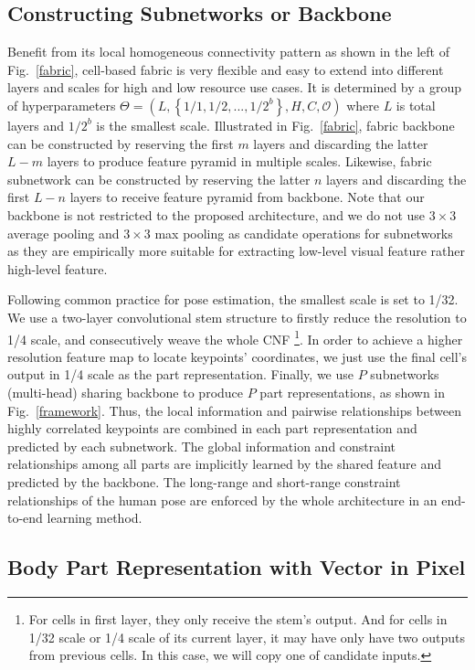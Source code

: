 \documentclass[journal]{IEEEtran}
\begin{document}
\subsection{Constructing Subnetworks or Backbone}
\label{subnet}
Benefit from its local homogeneous connectivity pattern as shown in the left of Fig.~\ref{fabric}, cell-based fabric is very flexible and easy to extend into different layers and scales for high and low resource use cases. It is determined by a group of hyperparameters $\Theta = (L, \left\{1/1,1/2,...,1/2^b\right\}, H, C, \mathcal{O})$ where $L$ is total layers and $1/2^b$ is the smallest scale. Illustrated in Fig.~\ref{fabric}, fabric backbone can be constructed by reserving the first $m$ layers and discarding the latter $L-m$ layers to produce feature pyramid in multiple scales. Likewise, fabric subnetwork can be constructed by reserving the latter $n$ layers and discarding the first $L-n$ layers to receive feature pyramid from backbone. Note that our backbone is not restricted to the proposed architecture, and we do not use $3\times3$ average pooling and $3\times3$ max pooling as candidate operations for subnetworks as they are empirically more suitable for extracting low-level visual feature rather high-level feature.

Following common practice for pose estimation, the smallest scale is set to 1/32. We use a two-layer convolutional stem structure to firstly reduce the resolution to 1/4 scale, and consecutively weave the whole CNF \footnote{For cells in first layer, they only receive the stem's output. And for cells in 1/32 scale or 1/4 scale of its current layer, it may have only have two outputs from previous cells. In this case, we will copy one of candidate inputs.}. In order to achieve a higher resolution feature map to locate keypoints' coordinates, we just use the final cell's output in 1/4 scale as the part representation.  Finally, we use $P$ subnetworks (multi-head) sharing backbone to produce $P$ part representations, as shown in Fig.~\ref{framework}. Thus, the local information and pairwise relationships between highly correlated keypoints are combined in each part representation and predicted by each subnetwork. The global information and constraint relationships among all parts are implicitly learned by the shared feature and predicted by the backbone. The long-range and short-range constraint relationships of the human pose are enforced by the whole architecture in an end-to-end learning method. 


\subsection{Body Part Representation with Vector in Pixel}
\label{vector in pixel}
\end{document}

